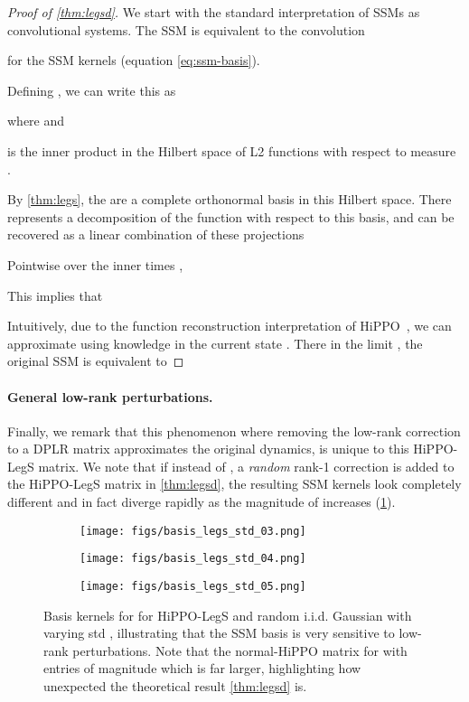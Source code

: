 \documentclass{article}
\begin{document}
\begin{proof}[Proof of \cref{thm:legsd}]We start with the standard interpretation of SSMs as convolutional systems.
  The SSM  is equivalent to the convolution
  
  for the SSM kernels  (equation \eqref{eq:ssm-basis}).

  Defining , we can write this as
  
  where  and
  
  is the inner product in the Hilbert space of L2 functions with respect to measure .

  By \cref{thm:legs}, the  are a complete orthonormal basis in this Hilbert space.
  There  represents a decomposition of the function  with respect to this basis, and can be recovered as a linear combination of these projections
  
  Pointwise over the inner times ,
  
  This implies that
  
  Intuitively, due to the function reconstruction interpretation of HiPPO~\citep{gu2022hippo},
  we can approximate  using knowledge in the current state .
  There in the limit ,
  the original SSM is equivalent to
  
\end{proof}

\paragraph{General low-rank perturbations.}

Finally, we remark that this phenomenon where removing the low-rank correction to a DPLR matrix approximates the original dynamics, is unique to this HiPPO-LegS matrix.
We note that if instead of , a \emph{random} rank-1 correction is added to the HiPPO-LegS matrix in \cref{thm:legsd},
the resulting SSM kernels look completely different and in fact diverge rapidly as the magnitude of  increases (\cref{fig:basis-noise}).

\begin{figure}[!ht]
\begin{subfigure}{.32\linewidth}\centering
  \texttt{[image: figs/basis\_legs\_std\_03.png]}
  \caption{}
\end{subfigure}
\begin{subfigure}{.32\linewidth}\centering
  \texttt{[image: figs/basis\_legs\_std\_04.png]}
  \caption{}
\end{subfigure}
\begin{subfigure}{.32\linewidth}\centering
  \texttt{[image: figs/basis\_legs\_std\_05.png]}
  \caption{}
\end{subfigure}
\caption{
  Basis kernels for  for HiPPO-LegS  and random i.i.d. Gaussian  with varying std ,
  illustrating that the SSM basis is very sensitive to low-rank perturbations.
  Note that the normal-HiPPO matrix  for  with entries of magnitude  which is far larger,
  highlighting how unexpected the theoretical result \cref{thm:legsd} is.
}
\label{fig:basis-noise}
\end{figure}
\end{document}

